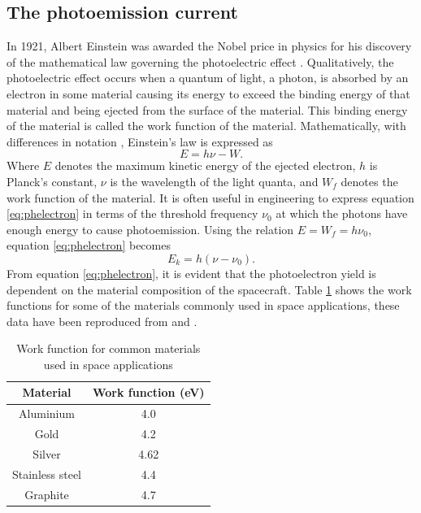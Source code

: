 \subsection*{The photoemission current}
In 1921, Albert Einstein was awarded the Nobel price in physics for his discovery of the mathematical law governing the photoelectric effect \parencite{NobelMediaAB}. Qualitatively, the photoelectric effect occurs when a quantum of light, a photon, is absorbed by an electron in some material causing its energy to exceed the binding energy of that material and being ejected from the surface of the material. This binding energy of the material is called the work function of the material. Mathematically, with differences in notation \parencite{Einstein1905}, Einstein's law is expressed as
\begin{equation}\label{eq:phelectron}
    E = h \nu - W.
\end{equation}
Where $E$ denotes the maximum kinetic energy of the ejected electron, $h$ is Planck's constant, $\nu$ is the wavelength of the light quanta, and $W_f$ denotes the work function of the material. It is often useful in engineering to express equation \eqref{eq:phelectron} in terms of the threshold frequency $\nu_0$ at which the photons have enough energy to cause photoemission. Using the relation $E = W_f = h \nu_0$, equation \eqref{eq:phelectron} becomes
\begin{equation}\label{eq:phfreq}
    E_{k} = h(\nu - \nu_0).
\end{equation}
From equation \eqref{eq:phelectron}, it is evident that the photoelectron yield is dependent on the material composition of the spacecraft. Table \ref{tab:workfunc} shows the work functions for some of the materials commonly used in space applications, these data have been reproduced from \parencite{Feuerbacher1972} and \parencite{TaylorandFrancisGroup2019}.

\begin{table}[h!]
    \centering
    \begin{tabular}{|c|c|}
        \hline
        \textbf{Material} & \textbf{Work function (eV)} \\ \hline
        Aluminium         & 4.0                    \\ \hline
        Gold              & 4.2                    \\ \hline
        Silver            & 4.62                   \\ \hline
        Stainless steel   & 4.4                    \\ \hline
        Graphite          & 4.7                    \\ \hline
    \end{tabular}
    \caption{Work function for common materials used in space applications}
    \label{tab:workfunc}
\end{table}

